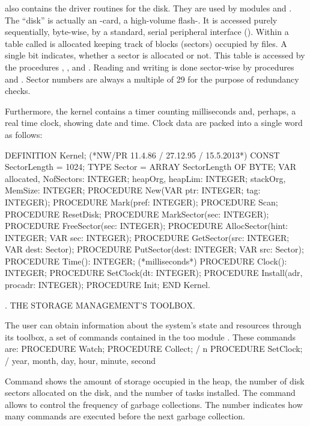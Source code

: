  also contains the driver routines for the disk. They are used by modules  and . The ``disk'' is actually an -card, a high-volume flash-. It is accessed purely sequentially, byte-wise, by a standard, serial peripheral interface (). Within  a table called  is allocated keeping track of blocks (sectors) occupied by files. A single bit indicates, whether a sector is allocated or not. This table is accessed by the procedures , , and . Reading and writing is done sector-wise by procedures  and . Sector numbers are always a multiple of 29 for the purpose of redundancy checks.

Furthermore, the kernel contains a timer counting milliseconds and, perhaps, a real time clock, showing date and time. Clock data are packed into a single word as follows:


\begintt
DEFINITION Kernel; (*NW/PR 11.4.86 / 27.12.95 / 15.5.2013*) CONST SectorLength = 1024;
TYPE Sector = ARRAY SectorLength OF BYTE;
VAR allocated, NofSectors: INTEGER;
heapOrg, heapLim: INTEGER;
stackOrg, MemSize: INTEGER;
PROCEDURE New(VAR ptr: INTEGER; tag: INTEGER); PROCEDURE Mark(pref: INTEGER);
PROCEDURE Scan;
PROCEDURE ResetDisk;
PROCEDURE MarkSector(sec: INTEGER);
PROCEDURE FreeSector(sec: INTEGER);
PROCEDURE AllocSector(hint: INTEGER; VAR sec: INTEGER); PROCEDURE GetSector(src: INTEGER; VAR dest: Sector); PROCEDURE PutSector(dest: INTEGER; VAR src: Sector); PROCEDURE Time(): INTEGER; (*milliseconds*)
PROCEDURE Clock(): INTEGER;
PROCEDURE SetClock(dt: INTEGER);
PROCEDURE Install(adr, procadr: INTEGER);
PROCEDURE Init;
END Kernel.
\endtt

. THE STORAGE MANAGEMENT'S TOOLBOX.

The user can obtain information about the system's state and resources through its toolbox, a set of commands contained in the too module . These commands are:
\begintt
PROCEDURE Watch;
PROCEDURE Collect; / n
PROCEDURE SetClock; / year, month, day, hour, minute, second
\endtt

\noindent Command  shows the amount of storage occupied in the heap, the number of disk sectors allocated on the disk, and the number of tasks installed. The command  allows to control the frequency of garbage collections. The number  indicates how many commands are executed before the next garbage collection.

